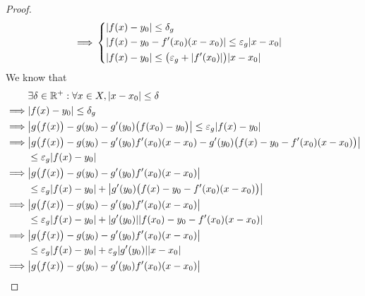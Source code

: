 \begin{proof}
\begin{align*}
    \implies & \begin{dcases}
                 \abs{f(x) - y_0} \leq \delta_g                                        \\
                 \abs{f(x) - y_0 - f'(x_0) (x - x_0)} \leq \varepsilon_g \abs{x - x_0} \\
                 \abs{f(x) - y_0} \leq \big(\varepsilon_g + \abs{f'(x_0)}\big) \abs{x - x_0}
               \end{dcases}
  \end{align*}
  We know that
  \begin{align*}
             & \exists \delta \in \R^+ : \forall x \in X, \abs{x - x_0} \leq \delta                                                 \\
    \implies & \abs{f(x) - y_0} \leq \delta_g                                                                                       \\
    \implies & \abs{g\big(f(x)\big) - g(y_0) - g'(y_0) \big(f(x_0) - y_0\big)} \leq \varepsilon_g \abs{f(x) - y_0}                  \\
    \implies & \abs{g\big(f(x)\big) - g(y_0) - g'(y_0) f'(x_0) (x - x_0) - g'(y_0) \big(f(x) - y_0 - f'(x_0) (x - x_0)\big)}        \\
             & \leq \varepsilon_g \abs{f(x) - y_0}                                                                                  \\
    \implies & \abs{g\big(f(x)\big) - g(y_0) - g'(y_0) f'(x_0) (x - x_0)}                                                           \\
             & \leq \varepsilon_g \abs{f(x) - y_0} + \abs{g'(y_0) \big(f(x) - y_0 - f'(x_0) (x - x_0)\big)}                         \\
    \implies & \abs{g\big(f(x)\big) - g(y_0) - g'(y_0) f'(x_0) (x - x_0)}                                                           \\
             & \leq \varepsilon_g \abs{f(x) - y_0} + \abs{g'(y_0)} \abs{f(x_0) - y_0 - f'(x_0) (x - x_0)}                           \\
    \implies & \abs{g\big(f(x)\big) - g(y_0) - g'(y_0) f'(x_0) (x - x_0)}                                                           \\
             & \leq \varepsilon_g \abs{f(x) - y_0} + \varepsilon_g \abs{g'(y_0)} \abs{x - x_0}                                      \\
    \implies & \abs{g\big(f(x)\big) - g(y_0) - g'(y_0) f'(x_0) (x - x_0)}                                                           \\

\end{align*}
\end{proof}
